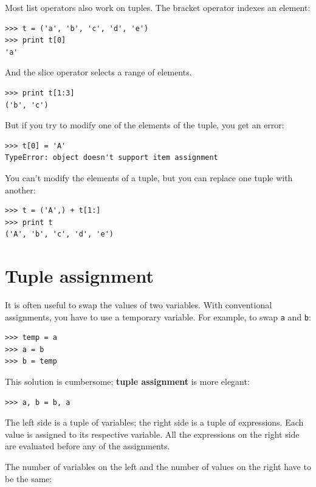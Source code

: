 \documentclass[10pt]{book}
\begin{document}
Most list operators also work on tuples.  The bracket operator
indexes an element:

\begin{verbatim}
>>> t = ('a', 'b', 'c', 'd', 'e')
>>> print t[0]
'a'
\end{verbatim}
%
And the slice operator selects a range of elements.

\begin{verbatim}
>>> print t[1:3]
('b', 'c')
\end{verbatim}
%
But if you try to modify one of the elements of the tuple, you get
an error:

\begin{verbatim}
>>> t[0] = 'A'
TypeError: object doesn't support item assignment
\end{verbatim}
%
You can't modify the elements of a tuple, but you can replace
one tuple with another:

\begin{verbatim}
>>> t = ('A',) + t[1:]
>>> print t
('A', 'b', 'c', 'd', 'e')
\end{verbatim}
%

\section{Tuple assignment}
\label{tuple.assignment}

It is often useful to swap the values of two variables.
With conventional assignments, you have to use a temporary
variable.  For example, to swap {\tt a} and {\tt b}:

\begin{verbatim}
>>> temp = a
>>> a = b
>>> b = temp
\end{verbatim}
%
This solution is cumbersome; {\bf tuple assignment} is more elegant:

\begin{verbatim}
>>> a, b = b, a
\end{verbatim}
%
The left side is a tuple of variables; the right side is a tuple of
expressions.  Each value is assigned to its respective variable.  
All the expressions on the right side are evaluated before any
of the assignments.

The number of variables on the left and the number of
values on the right have to be the same:
\end{document}
